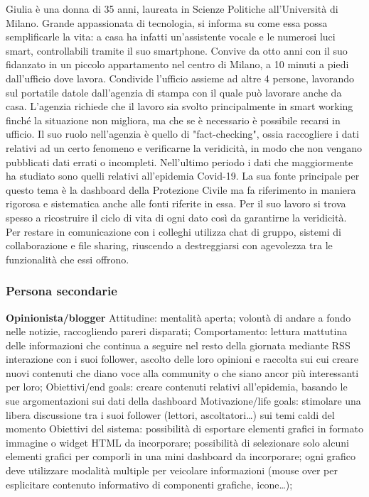 Giulia è una donna di 35 anni, laureata in Scienze Politiche all'Università di Milano.
Grande appassionata di tecnologia, si informa su come essa possa semplificarle la vita: a casa ha infatti un'assistente vocale e le numerosi luci smart, controllabili tramite il suo smartphone.
Convive da otto anni con il suo fidanzato in un piccolo appartamento nel centro di Milano, a 10 minuti a piedi dall'ufficio dove lavora. Condivide l'ufficio assieme ad altre 4 persone, lavorando sul portatile datole dall'agenzia di stampa con il quale può lavorare anche da casa. L'agenzia richiede che il lavoro sia svolto principalmente in smart working finché la situazione non migliora, ma che se è necessario è possibile recarsi in ufficio.
Il suo ruolo nell'agenzia è quello di "fact-checking", ossia raccogliere i dati relativi ad un certo fenomeno e verificarne la veridicità, in modo che non vengano pubblicati dati errati o incompleti. 
Nell'ultimo periodo i dati che maggiormente ha studiato sono quelli relativi all'epidemia Covid-19. La sua fonte principale per questo tema è la dashboard della Protezione Civile ma fa riferimento in maniera rigorosa e sistematica anche alle fonti riferite in essa. Per il suo lavoro si trova spesso a ricostruire il ciclo di vita di ogni dato così da garantirne la veridicità. 
Per restare in comunicazione con i colleghi utilizza chat di gruppo, sistemi di collaborazione e file sharing, riuscendo a destreggiarsi con agevolezza tra le funzionalità che essi offrono. 

\subsubsection*{Persona secondarie}
\textbf{Opinionista/blogger}
	Attitudine:
		mentalità aperta;
		volontà di andare a fondo nelle notizie, raccogliendo pareri disparati;
	Comportamento: 
		lettura mattutina delle informazioni che continua a seguire nel resto della giornata mediante RSS
		interazione con i suoi follower, ascolto delle loro opinioni e raccolta sui cui creare nuovi contenuti che diano voce alla community o che siano ancor più interessanti per loro;
	Obiettivi/end goals: creare contenuti relativi all'epidemia, basando le sue argomentazioni sui dati della dashboard
	Motivazione/life goals: stimolare una libera discussione tra i suoi follower (lettori, ascoltatori…) sui temi caldi del momento
	Obiettivi del sistema:
		possibilità di esportare elementi grafici in formato immagine o widget HTML da incorporare;
		possibilità di selezionare solo alcuni elementi grafici per comporli in una mini dashboard da incorporare; 
		ogni grafico deve utilizzare modalità multiple per veicolare informazioni (mouse over per esplicitare contenuto informativo di componenti grafiche, icone…); 


